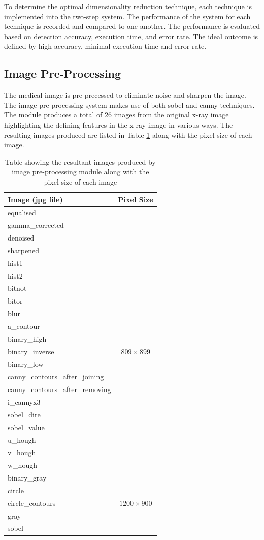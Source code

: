 \documentclass[11pt,twocolumn]{witseiepaper}
\begin{document}
	To determine the optimal dimensionality reduction technique, each technique is implemented into the two-step system. The performance of the system for each technique is recorded and compared to one another. The performance is evaluated based on detection accuracy, execution time, and error rate. The ideal outcome is defined by high accuracy, minimal execution time and error rate.
	
	\subsection{Image Pre-Processing}
	The medical image is pre-precessed to eliminate noise and sharpen the image. The image pre-processing system makes use of both sobel and canny techniques. The module produces a total of 26 images from the original x-ray image highlighting the defining features in the x-ray image in various ways. The resulting images produced are listed in Table \ref{tb: image table} along with the pixel size of each image.
	\vspace{-3mm}
	\begin{table}[!h]
		\centering
		\caption{Table showing the resultant images produced by image pre-processing module along with the pixel size of each image}
		\label{tb: image table}
		\begin{tabular}{| p{5.5cm} | c |}
			\hline
			Image (jpg file) & Pixel Size \\
			\hline \hline
			equalised &  \\
			gamma\_corrected &  \\
			denoised & \\
			sharpened & \\
			hist1 & \\
			hist2 & \\
			bitnot & \\
			bitor & \\
			blur & \\
			a\_contour & \\
			binary\_high & \\
			binary\_inverse & $809 \times 899$ \\
			binary\_low & \\
			canny\_contours\_after\_joining & \\
			canny\_contours\_after\_removing & \\
			i\_cannyx3 & \\
			sobel\_dire & \\
			sobel\_value & \\
			u\_hough & \\
			v\_hough & \\
			w\_hough & \\
			\hline
			binary\_gray & \\
			circle & \\
			circle\_contours & $1200 \times 900$ \\
			gray & \\
			sobel & \\
			\hline
		\end{tabular}
	\end{table}
\end{document}
